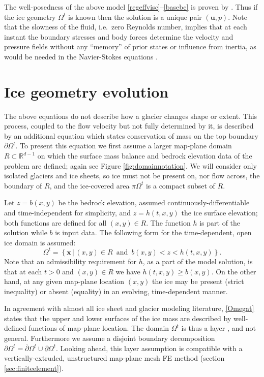 \documentclass[letterpaper,final,12pt,reqno]{amsart}
\newcommand{\RR}{\mathbb{R}}
\newcommand{\bu}{\mathbf{u}}
\newcommand{\bx}{\mathbf{x}}
\begin{document}
The well-posedness of the above model \eqref{regeffvisc}--\eqref{basebc} is proven by \cite{JouvetRappaz2011}.  Thus if the ice geometry $\Omega^t$ is known then the solution is a unique pair $(\bu,p)$.  Note that the slowness of the fluid, i.e.~zero Reynolds number, implies that at each instant the boundary stresses and body forces determine the velocity and pressure fields without any ``memory'' of prior states or influence from inertia, as would be needed in the Navier-Stokes equations \cite{Fowler1997}.


\section{Ice geometry evolution} \label{sec:stronggeometry}

The above equations do not describe how a glacier changes shape or extent.  This process, coupled to the flow velocity but not fully determined by it, is described by an additional equation which states conservation of mass on the top boundary $\overline{\partial} \Omega^t$.  To present this equation we first assume a larger map-plane domain $R\subset \RR^{d-1}$ on which the surface mass balance and bedrock elevation data of the problem are defined; again see Figure \ref{fig:domainnotation}.  We will consider only isolated glaciers and ice sheets, so ice must not be present on, nor flow across, the boundary of $R$, and the ice-covered area $\pi\Omega^t$ is a compact subset of $R$.

Let $z=b(x,y)$ be the bedrock elevation, assumed continuously-differentiable and time-independent for simplicity, and $z=h(t,x,y)$ the ice surface elevation; both functions are defined for all $(x,y)\in R$.  The function $h$ is part of the solution while $b$ is input data.  The following form for the time-dependent, open ice domain is assumed:
\begin{equation}
\Omega^t = \left\{\bx\,\big|\,(x,y)\in R \,\text{ and }\, b(x,y) < z < h(t,x,y)\right\}.  \label{Omegat}
\end{equation}
Note that an admissibility requirement for $h$, as a part of the model solution, is that at each $t>0$ and $(x,y)\in R$ we have $h(t,x,y) \ge b(x,y)$.  On the other hand, at any given map-plane location $(x,y)$ the ice may be present (strict inequality) or absent (equality) in an evolving, time-dependent manner.

In agreement with almost all ice sheet and glacier modeling literature, \eqref{Omegat} states that the upper and lower surfaces of the ice mass are described by well-defined functions of map-plane location.  The domain $\Omega^t$ is thus a layer \cite{Bueler2020}, and not general.  Furthermore we assume a disjoint boundary decomposition $\partial \Omega^t = \overline{\partial} \Omega^t \cup \underline{\partial} \Omega^t$.  Looking ahead, this layer assumption is compatible with a vertically-extruded, unstructured map-plane mesh FE method (section \ref{sec:finiteelement}).
\end{document}
